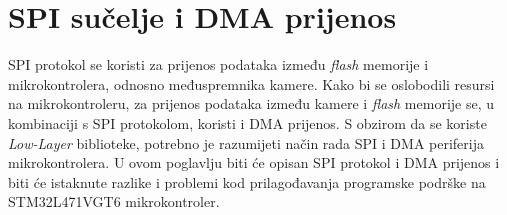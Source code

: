 \chapter{SPI sučelje i DMA prijenos}

SPI protokol se koristi za prijenos podataka između \textit{flash} memorije i mikrokontrolera, odnosno međuspremnika kamere. Kako bi se oslobodili resursi na mikrokontroleru, za prijenos podataka između kamere i \textit{flash} memorije se, u kombinaciji s SPI protokolom, koristi i DMA prijenos. S obzirom da se koriste \textit{Low-Layer} biblioteke, potrebno je razumijeti način rada SPI i DMA periferija mikrokontrolera. U ovom poglavlju biti će opisan SPI protokol i DMA prijenos i biti će istaknute razlike i problemi kod prilagođavanja programske podrške na STM32L471VGT6 mikrokontroler.